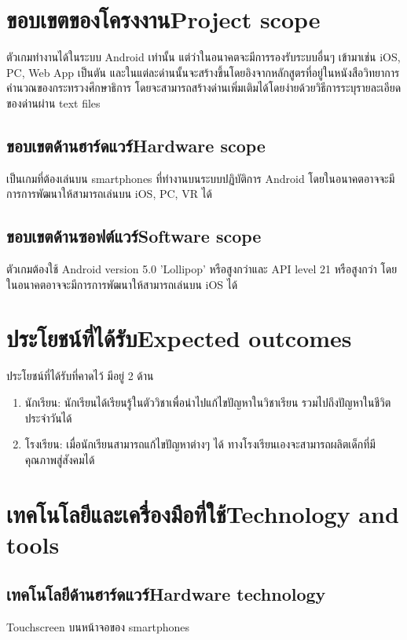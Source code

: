 \section{\ifcpe ขอบเขตของโครงงาน\else Project scope\fi}
ตัวเกมทำงานได้ในระบบ Android เท่านั้น แต่ว่าในอนาคตจะมีการรองรับระบบอื่นๆ 
เข้ามาเช่น iOS, PC, Web App เป็นตัน 
และในแต่ละด่านนั้นจะสร้างขึ้นโดยอิงจากหลักสูตรที่อยู่ในหนังสือวิทยาการคำนวณของกระทรวงศึกษาธิการ
โดยจะสามารถสร้างด่านเพิ่มเติมได้โดยง่ายด้วยวิธีการระบุรายละเอียดของด่านผ่าน \newline text files

\subsection{\ifcpe ขอบเขตด้านฮาร์ดแวร์\else Hardware scope\fi}
เป็นเกมที่ต้องเล่นบน smartphones ที่ทำงานบนระบบปฏิบัติการ Android โดยในอนาคตอาจจะมีการการพัฒนาให้สามารถเล่นบน iOS, PC, VR ได้

\subsection{\ifcpe ขอบเขตด้านซอฟต์แวร์\else Software scope\fi}
ตัวเกมต้องใช้ Android version 5.0 'Lollipop' หรือสูงกว่าและ API level 21 หรือสูงกว่า
โดยในอนาคตอาจจะมีการการพัฒนาให้สามารถเล่นบน iOS ได้

\section{\ifcpe ประโยชน์ที่ได้รับ\else Expected outcomes\fi}
ประโยชน์ที่ได้รับที่คาดไว้ มีอยู่ 2 ด้าน 
\begin{enumerate}
    \item นักเรียน: นักเรียนได้เรียนรู้ในตัววิชาเพื่อนำไปแก้ไขปัญหาในวิชาเรียน รวมไปถึงปัญหาในชีวิตประจำวันได้
    \item โรงเรียน: เมื่อนักเรียนสามารถแก้ไขปัญหาต่างๆ ได้ ทางโรงเรียนเองจะสามารถผลิตเด็กที่มีคุณภาพสู่สังคมได้ 
\end{enumerate}

\section{\ifcpe เทคโนโลยีและเครื่องมือที่ใช้\else Technology and tools\fi}

\subsection{\ifcpe เทคโนโลยีด้านฮาร์ดแวร์\else Hardware technology\fi}
Touchscreen บนหน้าจอของ smartphones

